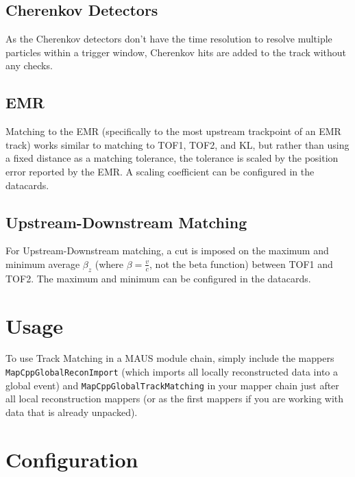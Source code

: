 \subsection{Cherenkov Detectors}\label{subsec:tmckovs}

As the Cherenkov detectors don't have the time resolution to resolve multiple particles within a trigger window,
Cherenkov hits are added to the track without any checks.

\subsection{EMR}\label{subsec:tmemr}

Matching to the EMR (specifically to the most upstream trackpoint of an EMR track) works similar to matching to TOF1,
TOF2, and KL, but rather than using a fixed distance as a matching tolerance, the tolerance is scaled by the position
error reported by the EMR. A scaling coefficient can be configured in the datacards.

\subsection{Upstream-Downstream Matching}\label{subsec:tmusdsmatching}

For Upstream-Downstream matching, a cut is imposed on the maximum and minimum average $\beta_{z}$ (where
$\beta = \frac{v}{c}$, not the beta function) between TOF1 and TOF2. The maximum and minimum can be configured in the
datacards.

\section{Usage}\label{sec:tmusage}

To use Track Matching in a MAUS module chain, simply include the mappers \texttt{MapCppGlobalReconImport} (which
imports all locally reconstructed data into a global event) and \texttt{MapCppGlobalTrackMatching} in your mapper chain
just after all local reconstruction mappers (or as the first mappers if you are working with data that is already unpacked).

\section{Configuration}\label{sec:tmconfig}

